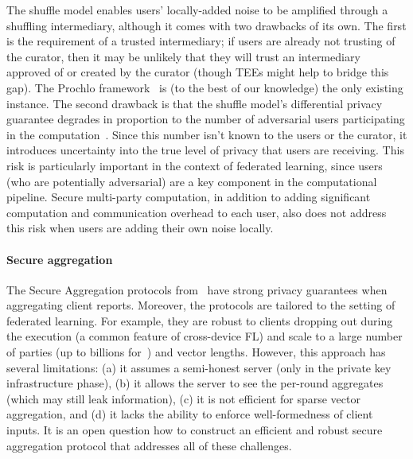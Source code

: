 The shuffle model enables users' locally-added noise to be amplified through a shuffling intermediary, although it comes with two drawbacks of its own.
The first is the requirement of a trusted intermediary; if users are already not trusting of the curator, then it may be unlikely that they will trust an intermediary approved of or created by the curator (though TEEs might help to bridge this gap).  The Prochlo framework~\cite{prochlo} is (to the best of our knowledge) the only existing instance.
The second drawback is that the shuffle model's differential privacy guarantee degrades in proportion to the number of adversarial users participating in the computation~\cite{BalleBGN19}.
Since this number isn't known to the users or the curator, it introduces uncertainty into the true level of privacy that users are receiving.
This risk is particularly important in the context of federated learning, since users (who are potentially adversarial) are a key component in the computational pipeline.
Secure multi-party computation, in addition to adding significant computation and communication overhead to each user, also does not address this risk when users are adding their own noise locally.


\paragraph{Secure aggregation} 

The Secure Aggregation protocols from~\cite{bonawitz17secagg, bell20secagg} have strong privacy guarantees when aggregating client reports. Moreover, the protocols are tailored to the setting of federated learning. For example, they are robust to clients dropping out during the execution (a common feature of cross-device FL) and scale to a large number of parties (up to billions for~\citet{bell20secagg}) and vector lengths. However, this approach has several limitations: (a) it assumes a semi-honest server (only in the private key infrastructure phase), (b) it allows the server to see the per-round aggregates (which may still leak information), (c) it is not efficient for sparse vector aggregation, and (d) it lacks the ability to enforce well-formedness of client inputs.  It is an open question how to construct an efficient and robust secure aggregation protocol that addresses all of these challenges.



